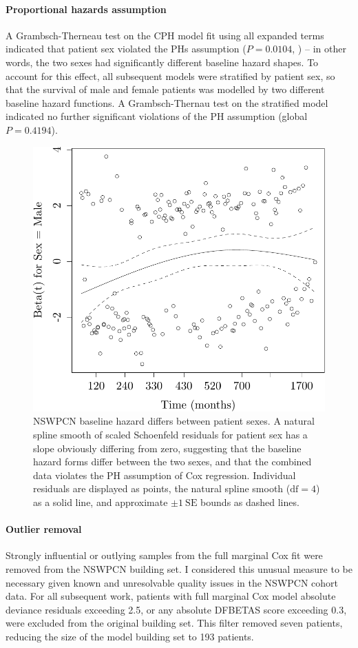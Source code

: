 \documentclass[dissertation.tex]{subfiles}
\begin{document}
\paragraph{Proportional hazards assumption}
A Grambsch-Therneau test \cite{Grambsch1994} on the \gls{CPH} model fit using all expanded terms indicated that patient sex violated the \glspl{PH} assumption ($P = 0.0104$, ) -- in other words, the two sexes had significantly different baseline hazard shapes.  To account for this effect, all subsequent models were stratified by patient sex, so that the survival of male and female patients was modelled by two different baseline hazard functions.  A Grambsch-Thernau test on the stratified model indicated no further significant violations of the \gls{PH} assumption (global $P = 0.4194$).

\begin{figure}[!htbp]
\centering
  \includegraphics[width=.7\linewidth]{analysis/nomogram/figure/05-eda-ph-check-full-1}
  \caption[Baseline hazard forms differ between patient sexes]{NSWPCN baseline hazard differs between patient sexes.  A natural spline smooth of scaled Schoenfeld residuals for patient sex has a slope obviously differing from zero, suggesting that the baseline hazard forms differ between the two sexes, and that the combined data violates the \acrshort{PH} assumption of Cox regression.  Individual residuals are displayed as points, the natural spline smooth ($\mathrm{df}=4$) as a solid line, and approximate $\pm 1\ \mathrm{SE}$ bounds as dashed lines.}
\label{fig:nomo-ph-plot-sex}
\end{figure}

\paragraph{Outlier removal}
Strongly influential or outlying samples from the full marginal Cox fit were removed from the \gls{NSWPCN} building set.  I considered this unusual measure to be necessary given known and unresolvable quality issues in the \gls{NSWPCN} cohort data.  For all subsequent work, patients with full marginal Cox model absolute deviance residuals exceeding 2.5, or any absolute DFBETAS score exceeding 0.3, were excluded from the original building set.  This filter removed seven patients, reducing the size of the model building set to 193 patients.	
\end{document}
